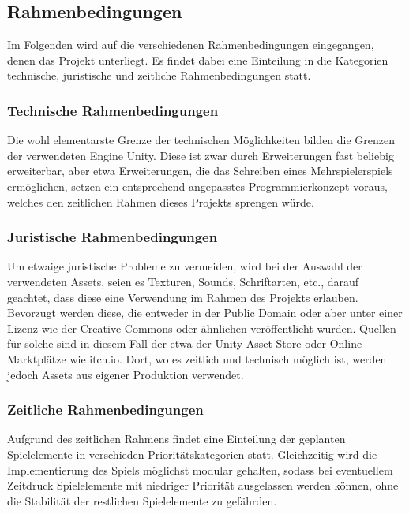 \documentclass[paper=A4,pagesize=auto,12pt,headinclude=true,footinclude=true,BCOR=0mm,DIV=calc]{scrartcl}
\newcommand{\sectionspace}{
	\vspace{0.5cm}
}
\begin{document}
\subsection{Rahmenbedingungen}\label{sec:Rahmenbedingungen}
Im Folgenden wird auf die verschiedenen Rahmenbedingungen eingegangen, denen das Projekt unterliegt. Es findet dabei eine Einteilung in die Kategorien technische, juristische und zeitliche Rahmenbedingungen statt. %
\subsubsection{Technische Rahmenbedingungen}
Die wohl elementarste Grenze der technischen Möglichkeiten bilden die Grenzen der verwendeten Engine Unity.  Diese ist zwar durch Erweiterungen fast beliebig erweiterbar, aber etwa Erweiterungen, die das Schreiben eines Mehrspielerspiels ermöglichen, setzen ein entsprechend angepasstes Programmierkonzept voraus, welches den zeitlichen Rahmen dieses Projekts sprengen würde.
\subsubsection{Juristische Rahmenbedingungen}
Um etwaige juristische Probleme zu vermeiden, wird bei der Auswahl der verwendeten Assets, seien es Texturen, Sounds, Schriftarten, etc., darauf geachtet, dass diese eine Verwendung im Rahmen des Projekts erlauben. Bevorzugt werden diese, die entweder in der Public Domain oder aber unter einer Lizenz wie der Creative Commons \cite{cc_licenses} oder ähnlichen veröffentlicht wurden. Quellen für solche sind in diesem Fall der etwa der Unity Asset Store oder Online-Marktplätze wie itch.io. Dort, wo es zeitlich und technisch möglich ist, werden jedoch Assets aus eigener Produktion verwendet.
\subsubsection{Zeitliche Rahmenbedingungen}
Aufgrund des zeitlichen Rahmens findet eine Einteilung der geplanten Spielelemente in verschieden Prioritätskategorien statt. Gleichzeitig wird die Implementierung des Spiels möglichst modular gehalten, sodass bei eventuellem Zeitdruck Spielelemente mit niedriger Priorität ausgelassen werden können, ohne die Stabilität der restlichen Spielelemente zu gefährden.

\sectionspace
\end{document}
